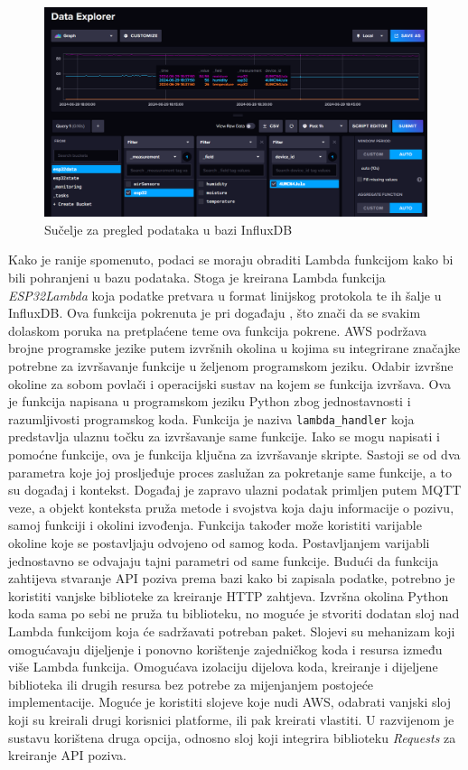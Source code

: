 \begin{figure}[ht]
	\centering
	\includegraphics[scale=0.4]{imgs/influxdb}
	\caption{Sučelje za pregled podataka u bazi InfluxDB}
	\label{fig:influxdb}
\end{figure}

Kako je ranije spomenuto, podaci se moraju obraditi Lambda funkcijom kako bi bili pohranjeni u bazu podataka. Stoga je kreirana Lambda funkcija \textit{ESP32Lambda} koja podatke pretvara u format linijskog protokola te ih šalje u InfluxDB. Ova funkcija pokrenuta je pri događaju , što znači da se svakim dolaskom poruka na pretplaćene teme ova funkcija pokrene. AWS podržava brojne programske jezike putem izvršnih okolina u kojima su integrirane značajke potrebne za izvršavanje funkcije u željenom programskom jeziku. Odabir izvršne okoline za sobom povlači i operacijski sustav na kojem se funkcija izvršava. Ova je funkcija napisana u programskom jeziku Python zbog jednostavnosti i razumljivosti programskog koda. Funkcija je naziva \lstinline[language=python]|lambda_handler| koja predstavlja ulaznu točku  za izvršavanje same funkcije. Iako se mogu napisati i pomoćne funkcije, ova je funkcija ključna za izvršavanje skripte. Sastoji se od dva parametra koje joj prosljeđuje proces zaslužan za pokretanje same funkcije, a to su događaj i kontekst. Događaj je zapravo ulazni podatak primljen putem MQTT veze, a objekt konteksta pruža metode i svojstva koja daju informacije o pozivu, samoj funkciji i okolini izvođenja. Funkcija također može koristiti varijable okoline  koje se postavljaju odvojeno od samog koda. Postavljanjem varijabli jednostavno se odvajaju tajni parametri od same funkcije. Budući da funkcija zahtijeva stvaranje API poziva prema bazi kako bi zapisala podatke, potrebno je koristiti vanjske biblioteke za kreiranje HTTP zahtjeva. Izvršna okolina Python koda sama po sebi ne pruža tu biblioteku, no moguće je stvoriti dodatan sloj nad Lambda funkcijom koja će sadržavati potreban paket. Slojevi su mehanizam koji omogućavaju dijeljenje i ponovno korištenje zajedničkog koda i resursa između više Lambda funkcija. Omogućava izolaciju dijelova koda, kreiranje i dijeljene biblioteka ili drugih resursa bez potrebe za mijenjanjem postojeće implementacije. Moguće je koristiti slojeve koje nudi AWS, odabrati vanjski sloj koji su kreirali drugi korisnici platforme, ili pak kreirati vlastiti. U razvijenom je sustavu korištena druga opcija, odnosno sloj koji integrira biblioteku \textit{Requests} za kreiranje API poziva. 

